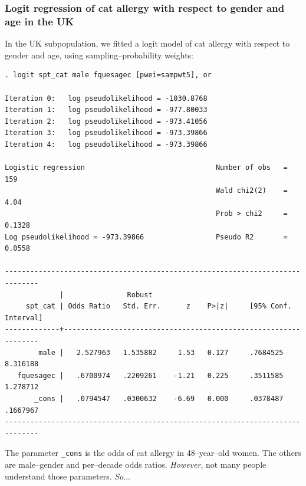 \documentclass[11pt]{beamer}
\begin{document}
\begin{frame}[fragile]
\frametitle{Logit regression of cat allergy with respect to gender and age in the UK}

In the UK subpopulation, we fitted a logit model of cat allergy
with respect to gender and age,
using sampling--probability weights:

\tiny
\begin{verbatim}
. logit spt_cat male fquesagec [pwei=sampwt5], or

Iteration 0:   log pseudolikelihood = -1030.8768  
Iteration 1:   log pseudolikelihood = -977.80033  
Iteration 2:   log pseudolikelihood = -973.41056  
Iteration 3:   log pseudolikelihood = -973.39866  
Iteration 4:   log pseudolikelihood = -973.39866  

Logistic regression                               Number of obs   =        159
                                                  Wald chi2(2)    =       4.04
                                                  Prob > chi2     =     0.1328
Log pseudolikelihood = -973.39866                 Pseudo R2       =     0.0558

------------------------------------------------------------------------------
             |               Robust
     spt_cat | Odds Ratio   Std. Err.      z    P>|z|     [95% Conf. Interval]
-------------+----------------------------------------------------------------
        male |   2.527963   1.535882     1.53   0.127     .7684525    8.316188
   fquesagec |   .6700974   .2209261    -1.21   0.225     .3511585    1.278712
       _cons |   .0794547   .0300632    -6.69   0.000     .0378487    .1667967
------------------------------------------------------------------------------
\end{verbatim}
\normalsize

The parameter \texttt{\_cons} is the odds of cat allergy in 48--year--old women.
The others are male--gender and per--decade odds ratios.
\textit{However}, not many people understand those parameters. \textit{So$\ldots$}

\end{frame}
\end{document}
